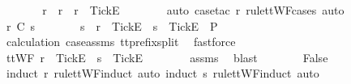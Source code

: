 \begin{isabellebody}
\ \ \ \ \isamarkupfalse%
\ \isamarkupfalse%
\ r{\isacharprime}\ \ {\isachardoublequoteopen}r\ {\isacharequal}\ r{\isacharprime}\ {\isacharat}\ {\isacharbrackleft}{\isacharbrackleft}Tick{\isacharbrackright}\isactrlsub E{\isacharbrackright}{\isachardoublequoteclose}\isanewline
\ \ \ \ \ \ \isamarkupfalse%
\ {\isacharparenleft}auto{\isacharcomma}\ case{\isacharunderscore}tac\ r{}\ rule{\isacharcolon}ttWF{\isachardot}cases{\isacharcomma}\ auto{\isacharparenright}\isanewline
\ \ \ \ \isamarkupfalse%
\ \isamarkupfalse%
\ {\isachardoublequoteopen}r\ {\isasymle}\isactrlsub C\ s{\isachardoublequoteclose}\isanewline
\ \ \ \ \isamarkupfalse%
\ \isamarkupfalse%
\ s{\isacharprime}\ \ {\isachardoublequoteopen}r{\isacharprime}\ {\isacharat}\ {\isacharbrackleft}{\isacharbrackleft}Tick{\isacharbrackright}\isactrlsub E{\isacharbrackright}\ {\isacharat}\ s{\isacharprime}\ {\isacharat}\ {\isacharbrackleft}{\isacharbrackleft}Tick{\isacharbrackright}\isactrlsub E{\isacharbrackright}\ {\isasymin}\ P{\isachardoublequoteclose}\isanewline
\ \ \ \ \ \ \isamarkupfalse%
\ calculation\ case{\isacharunderscore}assms{\isacharparenleft}{}{\isacharparenright}\ tt{\isacharunderscore}prefix{\isacharunderscore}split\ \isamarkupfalse%
\ fastforce\isanewline
\ \ \ \ \isamarkupfalse%
\ \isamarkupfalse%
\ {\isachardoublequoteopen}ttWF\ {\isacharparenleft}r{\isacharprime}\ {\isacharat}\ {\isacharbrackleft}{\isacharbrackleft}Tick{\isacharbrackright}\isactrlsub E{\isacharbrackright}\ {\isacharat}\ s{\isacharprime}\ {\isacharat}\ {\isacharbrackleft}{\isacharbrackleft}Tick{\isacharbrackright}\isactrlsub E{\isacharbrackright}{\isacharparenright}{\isachardoublequoteclose}\isanewline
\ \ \ \ \ \ \isamarkupfalse%
\ assms{\isacharparenleft}{}{\isacharparenright}\ \isamarkupfalse%
\ blast\isanewline
\ \ \ \ \isamarkupfalse%
\ \isamarkupfalse%
\ {\isachardoublequoteopen}False{\isachardoublequoteclose}\isanewline
\ \ \ \ \ \ \isamarkupfalse%
\ {\isacharparenleft}induct\ r{\isacharprime}\ rule{\isacharcolon}ttWF{\isachardot}induct{\isacharcomma}\ auto{\isacharcomma}\ induct\ s{\isacharprime}\ rule{\isacharcolon}ttWF{\isachardot}induct{\isacharcomma}\ auto{\isacharparenright}\isanewline
\ \ \isamarkupfalse%
\isanewline
{}\isamarkupfalse%
%
\endisatagproof

\end{isabellebody}
